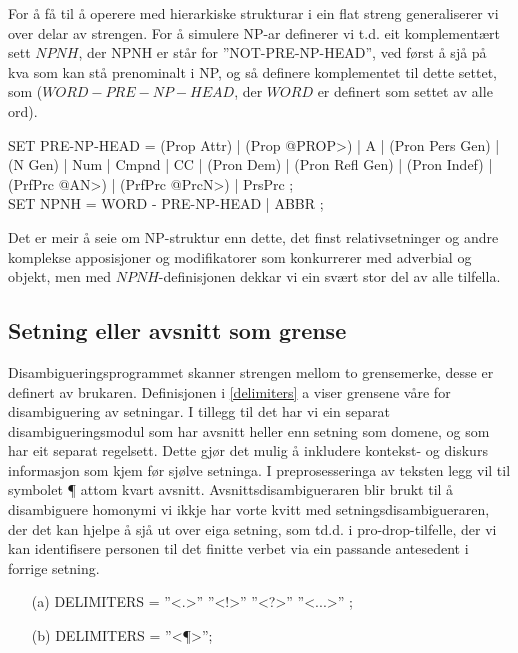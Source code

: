 \documentclass[a4paper,nynorsk]{article}
\begin{document}
For å få til å operere med hierarkiske strukturar i ein flat streng generaliserer vi over delar av strengen. For å simulere NP-ar definerer vi t.d. eit komplementært sett $NPNH$, der NPNH er står for ''NOT-PRE-NP-HEAD'', ved først å sjå på kva som kan stå prenominalt i NP, og så definere komplementet til dette settet, som ($WORD - PRE-NP-HEAD$, der $WORD$ er definert som settet av alle ord). %

\begin{example}
SET PRE-NP-HEAD = (Prop Attr) | (Prop @PROP>) | A | (Pron Pers Gen) | (N Gen) | 
                  Num | Cmpnd | CC | (Pron Dem)  | (Pron Refl Gen) | 
                  (Pron Indef) | (PrfPrc @AN>) |  (PrfPrc @PrcN>) | PrsPrc ; \\
SET NPNH        = WORD - PRE-NP-HEAD | ABBR ; \\                 
\end{example}

Det er meir å seie om NP-struktur enn dette, det finst relativsetninger og andre komplekse apposisjoner og modifikatorer som konkurrerer med adverbial og objekt, men med $NPNH$-definisjonen dekkar vi ein svært stor del av alle tilfella. %

\subsection{Setning eller avsnitt som grense}

Disambigueringsprogrammet skanner strengen mellom to grensemerke, desse er definert av brukaren. Definisjonen i \ref{delimiters} a viser grensene våre for disambiguering av setningar. I tillegg til det har vi ein separat disambigueringsmodul som har avsnitt heller enn setning som domene, og som har eit separat regelsett. Dette gjør det mulig å inkludere kontekst- og diskurs informasjon som kjem før sjølve setninga. I preprosesseringa av teksten legg vil til symbolet ¶ attom kvart avsnitt. Avsnittsdisambigueraren blir brukt til å disambiguere homonymi vi ikkje har vorte kvitt med setningsdisambigueraren, der det kan hjelpe å sjå ut over eiga setning, som td.d. i pro-drop-tilfelle, der vi kan identifisere personen til det finitte verbet via ein passande antesedent i forrige setning. %


\begin{example}\label{delimiters}
\begin{itemize}
\item[(a)] {DELIMITERS = ''<.>'' ''<!>'' ''<?>'' ''<...>'' ;}
\item[(b)] {DELIMITERS = ''<¶>'';}
\end{itemize}
\end{example}
\end{document}
